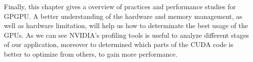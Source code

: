 \vspace{3.2em}

Finally, this chapter gives a overview of practices and performance studies for GPGPU. A better understanding of the hardware and memory management, as well as hardware limitation, will help us how to determinate the best usage of the GPUs. As we can see NVIDIA's profiling tools is useful to analyze different stages of our application, moreover to determined which parts of the CUDA code is better to optimize from others, to gain more performance.


